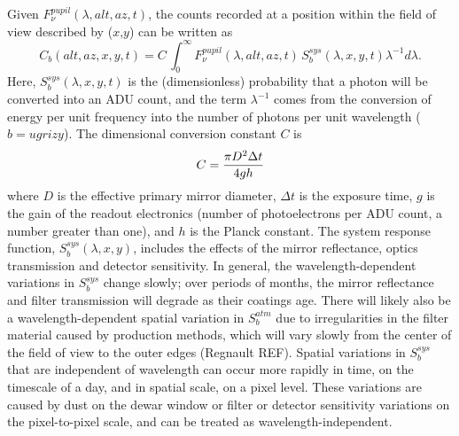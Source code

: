 \documentclass[12pt,preprint]{aastex}
\begin{document}
Given $F_\nu^{pupil}(\lambda,alt,az,t)$, the counts recorded at a
position within the field of view described by ($x$,$y$) can be
written as
\begin{equation}
\label{eqn:Fpupil2counts}
    C_b(alt,az,x,y,t) = C \, \int_0^\infty {F_\nu^{pupil}(\lambda,alt,az,t) \, S_b^{sys}(\lambda,x,y,t) \lambda^{-1}d\lambda}.
\end{equation}
Here, $S_b^{sys}(\lambda,x,y,t)$ is the (dimensionless) probability
that a photon will be converted into an ADU count, and the term
$\lambda^{-1}$ comes from the conversion of energy per unit frequency
into the number of photons per unit wavelength ($b=ugrizy$). The
dimensional conversion constant $C$ is
\begin{equation}
\label{eqn:Cconstant}
        C = {\pi D^2 \Delta t \over 4 g h }  
\end{equation}
where $D$ is the effective primary mirror diameter, $\Delta t$ is the
exposure time, $g$ is the gain of the readout electronics (number of
photoelectrons per ADU count, a number greater than one), and $h$ is
the Planck constant. The system response function,
$S_b^{sys}(\lambda,x,y)$, includes the effects of the mirror
reflectance, optics transmission and detector sensitivity. In general,
the wavelength-dependent variations in $S_b^{sys}$ change slowly; over
periods of months, the mirror reflectance and filter transmission will
degrade as their coatings age. There will likely also be a
wavelength-dependent spatial variation in $S_b^{atm}$ due to
irregularities in the filter material caused by production methods,
which will vary slowly from the center of the field of view to the
outer edges (Regnault REF). Spatial variations in $S_b^{sys}$ that are
independent of wavelength can occur more rapidly in time, on the
timescale of a day, and in spatial scale, on a pixel level. These
variations are caused by dust on the dewar window or filter or
detector sensitivity variations on the pixel-to-pixel scale, and can
be treated as wavelength-independent.
\end{document}
